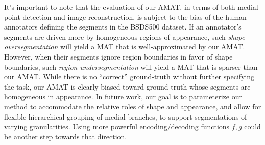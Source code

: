 \documentclass[10pt,twocolumn,letterpaper]{article}
\begin{document}
It's important to note that the evaluation of our AMAT, in terms of both medial point detection and image reconstruction, 
is subject to the bias of the human annotators defining the segments in the BSDS500 dataset.  
If an annotator's segments are driven more by homogeneous regions of appearance, such \emph{shape oversegmentation}
will yield a MAT that is well-approximated by our AMAT. 
However, when their segments ignore region boundaries in favor of shape boundaries, such \emph{region undersegmentation}
will yield a MAT that is sparser than our AMAT.
While there is no ``correct'' ground-truth without further specifying the task, 
our AMAT is clearly biased toward ground-truth whose segments are homogeneous in appearance.
In future work, our goal is to parameterize our method to accommodate the relative roles of shape and appearance,
and allow for flexible hierarchical grouping of medial branches, to support segmentations of varying granularities.
Using more powerful encoding/decoding functions $f,g$ could be another step towards that direction.



{\small


}
\end{document}
